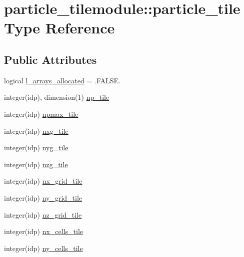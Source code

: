 \hypertarget{structparticle__tilemodule_1_1particle__tile}{}\section{particle\+\_\+tilemodule\+:\+:particle\+\_\+tile Type Reference}
\label{structparticle__tilemodule_1_1particle__tile}
\subsection*{Public Attributes}
\begin{DoxyCompactItemize}
\item 
logical \hyperlink{structparticle__tilemodule_1_1particle__tile_ac7e7825b8309e0cd4df8123cccdb2762}{l\+\_\+arrays\+\_\+allocated} = .F\+A\+L\+S\+E.
\item 
integer(idp), dimension(1) \hyperlink{structparticle__tilemodule_1_1particle__tile_ab9bcba3f2500e14759770e22962bfa95}{np\+\_\+tile}
\item 
integer(idp) \hyperlink{structparticle__tilemodule_1_1particle__tile_a76a0491ea4059cb2c71d4e561cebec62}{npmax\+\_\+tile}
\item 
integer(idp) \hyperlink{structparticle__tilemodule_1_1particle__tile_afa9d66b81da6da5af3cdf5de32e6b3f8}{nxg\+\_\+tile}
\item 
integer(idp) \hyperlink{structparticle__tilemodule_1_1particle__tile_a309ec6aa69081c317fda9aa4497c2f9f}{nyg\+\_\+tile}
\item 
integer(idp) \hyperlink{structparticle__tilemodule_1_1particle__tile_a96340a1208579adbab7ef4cf5d3c94bd}{nzg\+\_\+tile}
\item 
integer(idp) \hyperlink{structparticle__tilemodule_1_1particle__tile_aa8bef08bcd167e64ae1839891ba5a924}{nx\+\_\+grid\+\_\+tile}
\item 
integer(idp) \hyperlink{structparticle__tilemodule_1_1particle__tile_a7009b0860eadb148f132c6dea3f524cd}{ny\+\_\+grid\+\_\+tile}
\item 
integer(idp) \hyperlink{structparticle__tilemodule_1_1particle__tile_a70f14a99d2d1391d5e1b4d4a092c46f5}{nz\+\_\+grid\+\_\+tile}
\item 
integer(idp) \hyperlink{structparticle__tilemodule_1_1particle__tile_a8267ff1b30344b4ba328ddae88c40ad7}{nx\+\_\+cells\+\_\+tile}
\item 
integer(idp) \hyperlink{structparticle__tilemodule_1_1particle__tile_a34ecb077581b858b6127e54440d238e6}{ny\+\_\+cells\+\_\+tile}

\end{DoxyCompactItemize}
